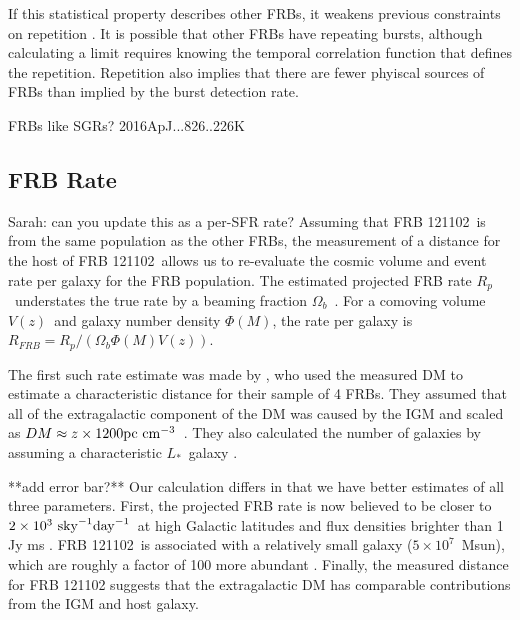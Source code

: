 \documentclass[twocolumn]{aastex61}
\newcommand{\frb}{FRB 121102}
\begin{document}
If this statistical property describes other FRBs, it weakens previous constraints on repetition \citep{2015MNRAS.454..457P,2015ApJ...807...16L}. It is possible that other FRBs have repeating bursts, although calculating a limit requires knowing the temporal correlation function that defines the repetition.  Repetition also implies that there are fewer phyiscal sources of FRBs than implied by the burst detection rate.

FRBs like SGRs? 2016ApJ...826..226K

\subsection{FRB Rate}
{\color{red} Sarah: can you update this as a per-SFR rate?}
Assuming that \frb\ is from the same population as the other FRBs, the measurement of a distance for the host of \frb\ allows us to re-evaluate the cosmic volume and event rate per galaxy for the FRB population. The estimated projected FRB rate $R_p$\ understates the true rate by a beaming fraction $\Omega_b$\ \citep[$\sim$10\%;][]{1998MNRAS.298..625T}. For a comoving volume $V(z)$\ and galaxy number density $\Phi(M)$, the rate per galaxy is $R_{FRB} = R_p /(\Omega_b \Phi(M)V (z))$. 

The first such rate estimate was made by \citet{2013Sci...341...53T}, who used the measured DM to estimate a characteristic distance for their sample of 4 FRBs. They assumed that all of the extragalactic component of the DM was caused by the IGM and scaled as $DM\approx z\times1200 \rm{pc}\ \rm{cm}^{-3}$\ \citep{2003ApJ...598L..79I,2004MNRAS.348..999I}. They also calculated the number of galaxies by assuming a characteristic $L_*$\ galaxy \citep[corresponding to stellar mass $M_* \approx 1011 M$;][]{2012MNRAS.421..621B}.

**add error bar?**
Our calculation differs in that we have better estimates of all three parameters. First, the projected FRB rate is now believed to be closer to $2\times10^3\ \rm{sky}^{-1} \rm{day}^{-1}$\ at high Galactic latitudes and flux densities brighter than 1 Jy ms \citep{2016arXiv161100458L,2016MNRAS.460L..30C, 2016MNRAS.455.2207R}. \frb\ is associated with a relatively small galaxy ($5\times10^7$\ Msun), which are roughly a factor of 100 more abundant \citep[$\Phi(M) \approx 10^{-2} \rm{Mpc}^{-3}$;][]{2007ApJ...665..265F}. Finally, the measured distance for FRB 121102 suggests that the extragalactic DM has comparable contributions from the IGM and host galaxy.
\end{document}
